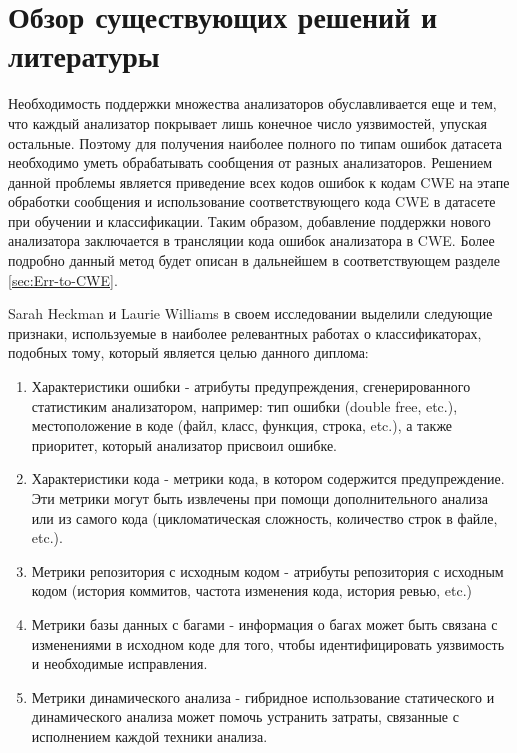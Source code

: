 \chapter{Обзор существующих решений и литературы}
\label{sec:Chapter2} 

Необходимость поддержки множества анализаторов обуславливается еще и тем, что каждый анализатор покрывает лишь конечное число уязвимостей, упуская остальные\cite{Delaitre2013OfMS, 3291, Bessey2010AFB}. Поэтому для получения наиболее полного по типам ошибок датасета необходимо уметь обрабатывать сообщения от разных анализаторов. Решением данной проблемы является приведение всех кодов ошибок к кодам CWE \cite{CWE-doc} на этапе обработки сообщения и использование соответствующего кода CWE в датасете при обучении и классификации. Таким образом, добавление поддержки нового анализатора заключается в трансляции кода ошибок анализатора в CWE. Более подробно данный метод будет описан в дальнейшем в соответствующем разделе \ref{sec:Err-to-CWE}.

Sarah Heckman и Laurie Williams в своем исследовании\cite{HECKMAN2011363} выделили следующие признаки, используемые в наиболее релевантных работах о классификаторах, подобных тому, который является целью данного диплома:
\begin{enumerate}
    \item Характеристики ошибки - атрибуты предупреждения, сгенерированного статистиким анализатором, например: тип ошибки (double free, etc.), местоположение в коде (файл, класс, функция, строка, etc.), а также приоритет, который анализатор присвоил ошибке.
    \item Характеристики кода - метрики кода, в котором содержится предупреждение. Эти метрики могут быть извлечены при помощи дополнительного анализа или из самого кода (цикломатическая сложность, количество строк в файле, etc.).
    \item Метрики репозитория с исходным кодом - атрибуты репозитория с исходным кодом (история коммитов, частота изменения кода, история ревью, etc.)
    \item Метрики базы данных с багами - информация о багах может быть связана с изменениями в исходном коде для того, чтобы идентифицировать уязвимость и необходимые исправления.
    \item Метрики динамического анализа - гибридное использование статического и динамического анализа может помочь устранить затраты, связанные с исполнением каждой техники анализа.
\end{enumerate}

